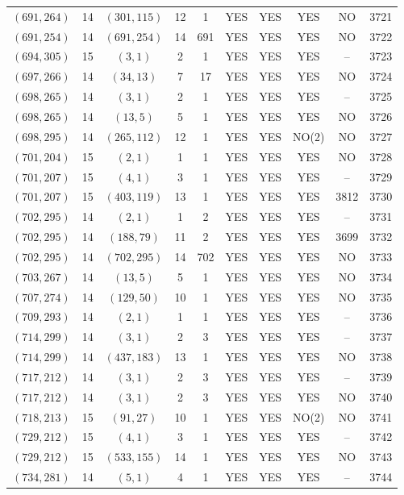 \begin{longtable}{|c|c|c|c|c|c|c|c|c|c|}
$(691, 264)$ & 14 & $(301, 115)$ & 12 & 1 & YES & YES & YES & NO & 3721\\
$(691, 254)$ & 14 & $(691, 254)$ & 14 & 691 & YES & YES & YES & NO & 3722\\
$(694, 305)$ & 15 & $(3, 1)$ & 2 & 1 & YES & YES & YES & -- & 3723\\
$(697, 266)$ & 14 & $(34, 13)$ & 7 & 17 & YES & YES & YES & NO & 3724\\
$(698, 265)$ & 14 & $(3, 1)$ & 2 & 1 & YES & YES & YES & -- & 3725\\
$(698, 265)$ & 14 & $(13, 5)$ & 5 & 1 & YES & YES & YES & NO & 3726\\
$(698, 295)$ & 14 & $(265, 112)$ & 12 & 1 & YES & YES & NO(2) & NO & 3727\\
$(701, 204)$ & 15 & $(2, 1)$ & 1 & 1 & YES & YES & YES & NO & 3728\\
$(701, 207)$ & 15 & $(4, 1)$ & 3 & 1 & YES & YES & YES & -- & 3729\\
$(701, 207)$ & 15 & $(403, 119)$ & 13 & 1 & YES & YES & YES & 3812 & 3730\\
$(702, 295)$ & 14 & $(2, 1)$ & 1 & 2 & YES & YES & YES & -- & 3731\\
$(702, 295)$ & 14 & $(188, 79)$ & 11 & 2 & YES & YES & YES & 3699 & 3732\\
$(702, 295)$ & 14 & $(702, 295)$ & 14 & 702 & YES & YES & YES & NO & 3733\\
$(703, 267)$ & 14 & $(13, 5)$ & 5 & 1 & YES & YES & YES & NO & 3734\\
$(707, 274)$ & 14 & $(129, 50)$ & 10 & 1 & YES & YES & YES & NO & 3735\\
$(709, 293)$ & 14 & $(2, 1)$ & 1 & 1 & YES & YES & YES & -- & 3736\\
$(714, 299)$ & 14 & $(3, 1)$ & 2 & 3 & YES & YES & YES & -- & 3737\\
$(714, 299)$ & 14 & $(437, 183)$ & 13 & 1 & YES & YES & YES & NO & 3738\\
$(717, 212)$ & 14 & $(3, 1)$ & 2 & 3 & YES & YES & YES & -- & 3739\\
$(717, 212)$ & 14 & $(3, 1)$ & 2 & 3 & YES & YES & YES & NO & 3740\\
$(718, 213)$ & 15 & $(91, 27)$ & 10 & 1 & YES & YES & NO(2) & NO & 3741\\
$(729, 212)$ & 15 & $(4, 1)$ & 3 & 1 & YES & YES & YES & -- & 3742\\
$(729, 212)$ & 15 & $(533, 155)$ & 14 & 1 & YES & YES & YES & NO & 3743\\
$(734, 281)$ & 14 & $(5, 1)$ & 4 & 1 & YES & YES & YES & -- & 3744\\

\end{longtable}
